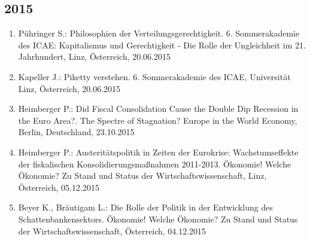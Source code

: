 \subsection*{2015}

\begin{enumerate}
	\item Pühringer S.: Philosophien der Verteilungsgerechtigkeit. 6. Sommerakademie des ICAE: Kapitalismus und Gerechtigkeit - Die Rolle der Ungleichheit im 21. Jahrhundert, Linz, Österreich, 20.06.2015
	\item Kapeller J.: Piketty verstehen. 6. Sommerakademie des ICAE, Universität Linz, Österreich, 20.06.2015
	\item Heimberger P.: Did Fiscal Consolidation Cause the Double Dip Recession in the Euro Area?. The Spectre of Stagnation? Europe in the World Economy, Berlin, Deutschland, 23.10.2015
	\item Heimberger P.: Austeritätspolitik in Zeiten der Eurokrise: Wachstumseffekte der fiskalischen Konsolidierungsmaßnahmen 2011-2013. Ökonomie! Welche Ökonomie? Zu Stand und Status der Wirtschaftswissenschaft, Linz, Österreich, 05.12.2015
	\item Beyer K., Bräutigam L.: Die Rolle der Politik in der Entwicklung des Schattenbankensektors. Ökonomie! Welche Ökonomie? Zu Stand und Status der Wirtschaftswissenschaft, Österreich, 04.12.2015
\end{enumerate}

